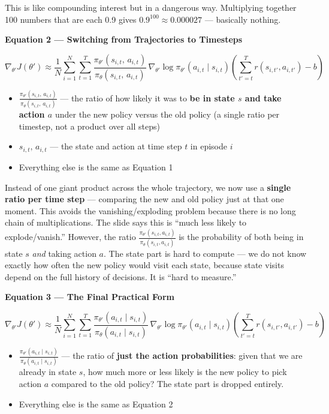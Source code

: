 This is like compounding interest but in a dangerous way. Multiplying together 100 numbers that are
each 0.9 gives $0.9^{100} \approx 0.000027$ --- basically nothing.

\textbf{Equation 2 --- Switching from Trajectories to Timesteps}

\[
\nabla_{\theta'} J(\theta')
\approx
\frac{1}{N}
\sum_{i=1}^N \sum_{t=1}^T
\frac{\pi_{\theta'}(s_{i,t},\, a_{i,t})}{\pi_\theta(s_{i,t},\, a_{i,t})}
\,\nabla_{\theta'} \log \pi_{\theta'}(a_{i,t} \mid s_{i,t})
\left( \sum_{t'=t}^T r(s_{i,t'}, a_{i,t'}) - b \right)
\]

\begin{itemize}
  \item $\frac{\pi_{\theta'}(s_{i,t},\, a_{i,t})}{\pi_\theta(s_{i,t},\, a_{i,t})}$ --- the ratio
    of how likely it was to \textbf{be in state $s$ and take action $a$} under the new policy
    versus the old policy (a single ratio per timestep, not a product over all steps)
  \item $s_{i,t},\, a_{i,t}$ --- the state and action at time step $t$ in episode $i$
  \item Everything else is the same as Equation 1
\end{itemize}

Instead of one giant product across the whole trajectory, we now use a \textbf{single ratio per
time step} --- comparing the new and old policy just at that one moment. This avoids the
vanishing/exploding problem because there is no long chain of multiplications. The slide says this
is ``much less likely to explode/vanish.'' However, the ratio
$\frac{\pi_{\theta'}(s_{i,t}, a_{i,t})}{\pi_\theta(s_{i,t}, a_{i,t})}$ is the probability of
both being in state $s$ \textit{and} taking action $a$. The state part is hard to compute --- we
do not know exactly how often the new policy would visit each state, because state visits depend on
the full history of decisions. It is ``hard to measure.''

\textbf{Equation 3 --- The Final Practical Form}

\[
\nabla_{\theta'} J(\theta')
\approx
\frac{1}{N}
\sum_{i=1}^N \sum_{t=1}^T
\frac{\pi_{\theta'}(a_{i,t} \mid s_{i,t})}{\pi_\theta(a_{i,t} \mid s_{i,t})}
\,\nabla_{\theta'} \log \pi_{\theta'}(a_{i,t} \mid s_{i,t})
\left( \sum_{t'=t}^T r(s_{i,t'}, a_{i,t'}) - b \right)
\]

\begin{itemize}
  \item $\frac{\pi_{\theta'}(a_{i,t} \mid s_{i,t})}{\pi_\theta(a_{i,t} \mid s_{i,t})}$ --- the
    ratio of \textbf{just the action probabilities}: given that we are already in state $s$, how
    much more or less likely is the new policy to pick action $a$ compared to the old policy? The
    state part is dropped entirely.
  \item Everything else is the same as Equation 2
\end{itemize}

